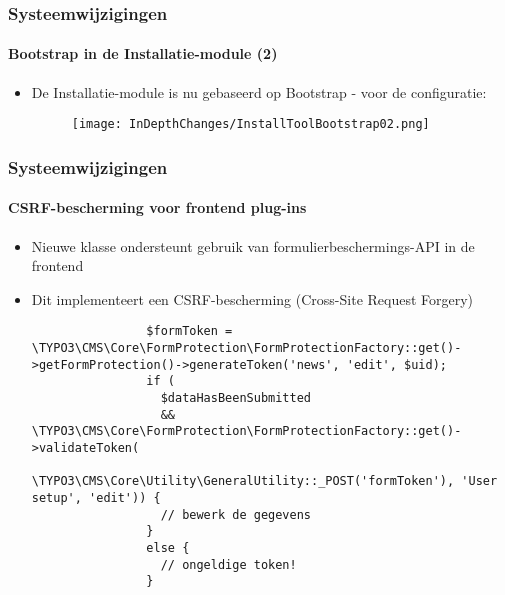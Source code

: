 
\begin{frame}[fragile]
	\frametitle{Systeemwijzigingen}
	\framesubtitle{Bootstrap in de Installatie-module (2)}

	\begin{itemize}

		\item De Installatie-module is nu gebaseerd op Bootstrap - voor de configuratie:

			\begin{figure}
				\texttt{[image: InDepthChanges/InstallToolBootstrap02.png]}
			\end{figure}

	\end{itemize}

\end{frame}


\begin{frame}[fragile]
	\frametitle{Systeemwijzigingen}
	\framesubtitle{CSRF-bescherming voor frontend plug-ins}

	\lstset{basicstyle=\tiny\ttfamily}

	\begin{itemize}

		\item Nieuwe klasse ondersteunt gebruik van formulierbeschermings-API in de frontend

		\item Dit implementeert een CSRF-bescherming (Cross-Site Request Forgery)

			\begin{lstlisting}
				$formToken = \TYPO3\CMS\Core\FormProtection\FormProtectionFactory::get()->getFormProtection()->generateToken('news', 'edit', $uid);
				if (
				  $dataHasBeenSubmitted
				  && \TYPO3\CMS\Core\FormProtection\FormProtectionFactory::get()->validateToken(
				    \TYPO3\CMS\Core\Utility\GeneralUtility::_POST('formToken'), 'User setup', 'edit')) {
				  // bewerk de gegevens
				}
				else {
				  // ongeldige token!
				}
			\end{lstlisting}

	\end{itemize}

\end{frame}

